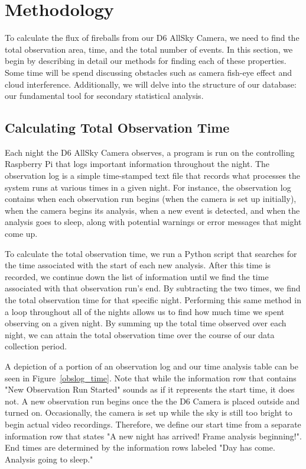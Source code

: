 

\chapter{Methodology}

To calculate the flux of fireballs from our D6 AllSky Camera, we need to find the total observation area, time, and the total number of events.
In this section, we begin by describing in detail our methods for finding each of these properties.
Some time will be spend discussing obstacles such as camera fish-eye effect and cloud interference.  
Additionally, we will delve into the structure of our database: our fundamental tool for secondary statistical analysis.

\section{Calculating Total Observation Time}

Each night the D6 AllSky Camera observes, a program is run on the controlling Raspberry Pi that logs important information throughout the night.
The observation log is a simple time-stamped text file that records what processes the system runs at various times in a given night.
For instance, the observation log contains when each observation run begins (when the camera is set up initially), when the camera begins its analysis, when a new event is detected, and when the analysis goes to sleep, along with potential warnings or error messages that might come up.

To calculate the total observation time, we run a Python script that searches for the time associated with the start of each new analysis.  
After this time is recorded, we continue down the list of information until we find the time associated with that observation run's end.  
By subtracting the two times, we find the total observation time for that specific night.  
Performing this same method in a loop throughout all of the nights allows us to find how much time we spent observing on a given night. 
By summing up the total time observed over each night, we can attain the total observation time over the course of our data collection period.

A depiction of a portion of an observation log and our time analysis table can be seen in Figure~\ref{obslog_time}.
Note that while the information row that contains "New Observation Run Started" sounds as if it represents the start time, it does not.
A new observation run begins once the the D6 Camera is placed outside and turned on.  
Occasionally, the camera is set up while the sky is still too bright to begin actual video recordings. 
Therefore, we define our start time from a separate information row that states "A new night has arrived! Frame analysis beginning!". 
End times are determined by the information rows labeled "Day has come.  Analysis going to sleep."

